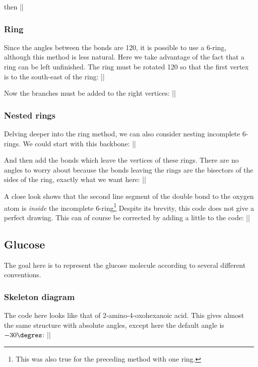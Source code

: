 \documentclass[10pt]{article}
\begin{document}
then
||

\subsubsection{Ring}
Since the angles between the bonds are 120\degres{}, it is possible to use a 6-ring, although this method is less natural. Here we take advantage of the fact that a ring can be left unfinished. The ring must be rotated 120\degres{} so that the first vertex is to the south-east of the ring:
||

Now the branches must be added to the right vertices:
||

\subsubsection{Nested rings}
Delving deeper into the ring method, we can also consider nesting incomplete 6-rings. We could start with this backbone:
||

And then add the bonds which leave the vertices of these rings. There are no angles to worry about because the bonds leaving the rings are the bisectors of the sides of the ring, exactly what we want here:
||

A close look shows that the second line segment of the double bond to the oxygen atom is \emph{inside} the incomplete 6-ring\footnote{This was also true for the preceding method with one ring.} Despite its brevity, this code does not give a perfect drawing. This can of course be corrected by adding a little to the code:
||

\subsection{Glucose}
The goal here is to represent the glucose molecule according to several different conventions.

\subsubsection{Skeleton diagram}
The code here looks like that of 2-amino-4-oxohexanoic acid. This gives almost the same structure with absolute angles, except here the default angle is $-30\degres$:
||
\end{document}
